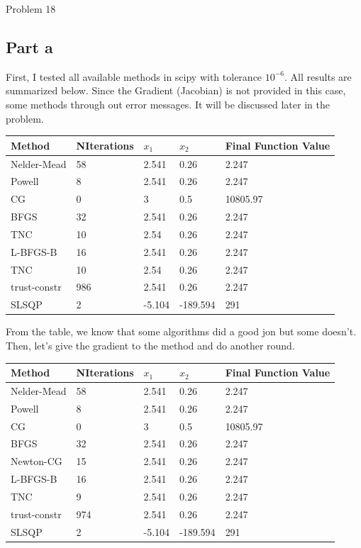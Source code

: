 \documentclass[12pt]{article}
\begin{document}
\begin{section}{Problem 18}
	\subsection{Part a}
	First, I tested all available methods in scipy with tolerance $10^{-6}$. All results are summarized below. Since the Gradient (Jacobian) is not provided in this case, some methods through out error messages. It will be discussed later in the problem. 
	
	
		\begin{tabular}{lllll}
			\hline
			Method & NIterations & $x_1$ & $x_2$& Final Function Value \\
			\hline\hline
			Nelder-Mead  & 58  & 2.541  & 0.26     & 2.247    \\
			Powell       & 8   & 2.541  & 0.26     & 2.247    \\
			CG           & 0   & 3      & 0.5      & 10805.97 \\
			BFGS         & 32  & 2.541  & 0.26     & 2.247    \\
			TNC          & 10  & 2.54   & 0.26     & 2.247    \\
			L-BFGS-B     & 16  & 2.541  & 0.26     & 2.247    \\
			TNC          & 10  & 2.54   & 0.26     & 2.247    \\
			trust-constr & 986 & 2.541  & 0.26     & 2.247    \\
			SLSQP        & 2   & -5.104 & -189.594 & 291     
		\end{tabular}
	
\vspace{10mm}
    From the table, we know that some algorithms did a good jon but some doesn't. Then, let's give the gradient to the method and do another round. 
    \vspace{5mm}
    	\begin{tabular}{lllll}
    		\hline
    		Method & NIterations & $x_1$ & $x_2$& Final Function Value \\
    		\hline\hline
			Nelder-Mead  & 58  & 2.541  & 0.26     & 2.247    \\
			Powell       & 8   & 2.541  & 0.26     & 2.247    \\
			CG           & 0   & 3      & 0.5      & 10805.97 \\
			BFGS         & 32  & 2.541  & 0.26     & 2.247    \\
			Newton-CG    & 15  & 2.541  & 0.26     & 2.247    \\
			L-BFGS-B     & 16  & 2.541  & 0.26     & 2.247    \\
			TNC          & 9   & 2.541  & 0.26     & 2.247    \\
			trust-constr & 974 & 2.541  & 0.26     & 2.247    \\
			SLSQP        & 2   & -5.104 & -189.594 & 291   
    	 \end{tabular}


\end{section}
\end{document}
